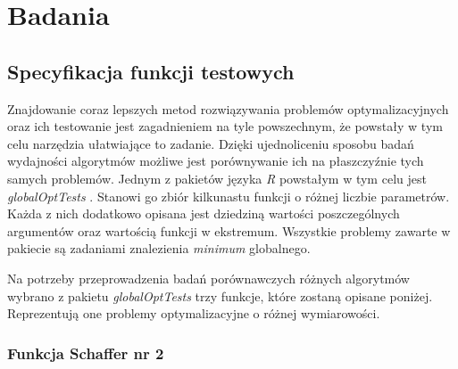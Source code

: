\newpage
\chapter{Badania}


\section{Specyfikacja funkcji testowych}
Znajdowanie coraz lepszych metod rozwiązywania problemów optymalizacyjnych oraz ich testowanie jest zagadnieniem na tyle powszechnym, że powstały w tym celu narzędzia ułatwiające to zadanie. Dzięki ujednoliceniu sposobu badań wydajności algorytmów możliwe jest porównywanie ich na płaszczyźnie tych samych problemów. Jednym z pakietów języka \emph{R} powstałym w tym celu jest \emph{globalOptTests} \cite{globalOptTestsPackage}. Stanowi go zbiór kilkunastu funkcji o różnej liczbie parametrów. Każda z nich dodatkowo opisana jest dziedziną wartości poszczególnych argumentów oraz wartością funkcji w ekstremum. Wszystkie problemy zawarte w pakiecie są zadaniami znalezienia \emph{minimum} globalnego.
\par
Na potrzeby przeprowadzenia badań porównawczych różnych algorytmów wybrano z pakietu \emph{globalOptTests} trzy funkcje, które zostaną opisane poniżej. Reprezentują one problemy  optymalizacyjne o różnej wymiarowości. 
\subsection{Funkcja Schaffer nr 2}

